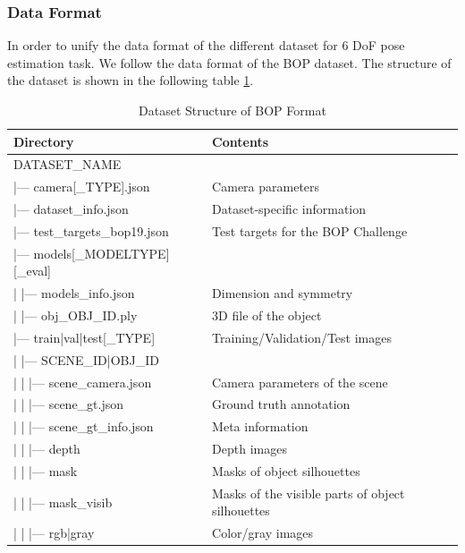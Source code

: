 \documentclass[12pt,DIV14,BCOR12mm,a4paper,footinclude=false,headinclude,parskip=half-,twoside,openright,cleardoublepage=empty,toc=index,bibliography=totoc,listof=totoc]{scrreprt}
\numberwithin{equation}{chapter}
\begin{document}
\subsubsection{Data Format}
In order to unify the data format of the different dataset for 6 DoF pose estimation task. We follow the data format of the BOP dataset. The structure of the dataset is shown in the following table \ref{tab:dataset}.
\begin{table}[ht]
  \centering
  \caption{Dataset Structure of BOP Format}
  \label{tab:dataset}
  \begin{tabular}{l l}
      \toprule
      Directory & Contents \\
      \midrule
      DATASET\_NAME & \\
      |--- camera[\_TYPE].json & Camera parameters\\
      |--- dataset\_info.json & Dataset-specific information\\
      |--- test\_targets\_bop19.json & Test targets for the BOP Challenge \\
      |--- models[\_MODELTYPE][\_eval] & \\
      | \quad |--- models\_info.json & Dimension and symmetry\\
      | \quad |--- obj\_OBJ\_ID.ply & 3D file of the object\\
      |--- train|val|test[\_TYPE] & Training/Validation/Test images\\
      | \quad |--- SCENE\_ID|OBJ\_ID & \\
      | \quad | \quad |--- scene\_camera.json & Camera parameters of the scene\\
      | \quad | \quad |--- scene\_gt.json & Ground truth annotation\\
      | \quad | \quad |--- scene\_gt\_info.json & Meta information\\
      | \quad | \quad |--- depth & Depth images\\
      | \quad | \quad |--- mask & Masks of object silhouettes\\
      | \quad | \quad |--- mask\_visib & Masks of the visible parts of object silhouettes\\
      | \quad | \quad |--- rgb|gray & Color/gray images\\
      \bottomrule
  \end{tabular}
\end{table}
\end{document}
